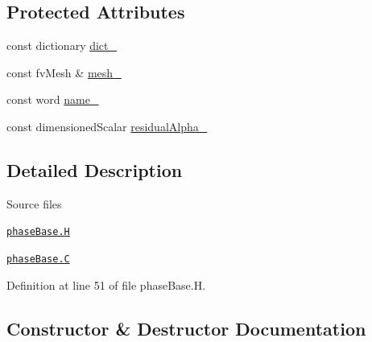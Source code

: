 \subsection*{Protected Attributes}
\begin{DoxyCompactItemize}
\item 
const dictionary \hyperlink{classFoam_1_1phaseBase_aa5700875c20f122199c58a0874e88573}{dict\+\_\+}
\item 
const fv\+Mesh \& \hyperlink{classFoam_1_1phaseBase_a23edeeeecebcef11921a33dd5d990570}{mesh\+\_\+}
\item 
const word \hyperlink{classFoam_1_1phaseBase_afd780271a9c45061cfdc62f5c3fc9929}{name\+\_\+}
\item 
const dimensioned\+Scalar \hyperlink{classFoam_1_1phaseBase_a80e4b957331ddeaf1ebe3d8a825cf24d}{residual\+Alpha\+\_\+}
\end{DoxyCompactItemize}


\subsection{Detailed Description}
\begin{DoxyParagraph}{Source files}

\begin{DoxyItemize}
\item \href{../../../home/carlo/data/GeN-Foam/GeN-Foam_ffn/GeN-Foam/GeN-Foam/classes/thermalHydraulics/src/phaseModels/phaseBase.H}{\tt phase\+Base.\+H} 
\item \href{../../../home/carlo/data/GeN-Foam/GeN-Foam_ffn/GeN-Foam/GeN-Foam/classes/thermalHydraulics/src/phaseModels/phaseBase.C}{\tt phase\+Base.\+C} 
\end{DoxyItemize}
\end{DoxyParagraph}


Definition at line 51 of file phase\+Base.\+H.



\subsection{Constructor \& Destructor Documentation}
\mbox{\label{classFoam_1_1phaseBase_a0a6ed58583503de31e182b26a7324e20}} 
